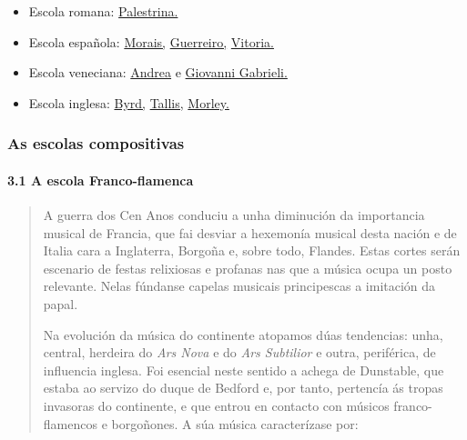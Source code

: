 \documentclass[
]{article}
\begin{document}
\begin{itemize}
\item
  Escola romana:
  \href{http://es.wikipedia.org/wiki/Giovanni_Pierluigi_da_Palestrina}{Palestrina.}
\item
  Escola española:
  \href{http://es.wikipedia.org/wiki/Crist\%C3\%B3bal_de_Morales}{Morais,}
  \href{http://es.wikipedia.org/wiki/Francisco_Guerrero}{Guerreiro,}
  \href{http://es.wikipedia.org/wiki/Tom\%C3\%A1s_Luis_de_Victoria}{Vitoria.}
\item
  Escola veneciana:
  \href{http://es.wikipedia.org/wiki/Andrea_Gabrieli}{Andrea} e
  \href{http://es.wikipedia.org/wiki/Giovanni_Gabrieli}{Giovanni
  Gabrieli.}
\item
  Escola inglesa:
  \href{http://es.wikipedia.org/wiki/William_Byrd}{Byrd,}
  \href{http://es.wikipedia.org/wiki/Thomas_Tallis}{Tallis,}
  \href{http://es.wikipedia.org/wiki/Thomas_Morley}{Morley.}
\end{itemize}

\hypertarget{as-escolas-compositivas}{%
\subsubsection{As escolas compositivas}\label{as-escolas-compositivas}}

\hypertarget{31-a-escola-franco-flamenca}{%
\paragraph{\texorpdfstring{\textbf{3.1 A escola
Franco-flamenca}}{3.1 A escola Franco-flamenca}}\label{31-a-escola-franco-flamenca}}

\begin{quote}
A guerra dos Cen Anos conduciu a unha diminución da importancia musical
de Francia, que fai desviar a hexemonía musical desta nación e de Italia
cara a Inglaterra, Borgoña e, sobre todo, Flandes. Estas cortes serán
escenario de festas relixiosas e profanas nas que a música ocupa un
posto relevante. Nelas fúndanse capelas musicais principescas a
imitación da papal.

Na evolución da música do continente atopamos dúas tendencias: unha,
central, herdeira do \emph{Ars Nova} e do \emph{Ars Subtilior} e outra,
periférica, de influencia inglesa. Foi esencial neste sentido a achega
de Dunstable, que estaba ao servizo do duque de Bedford e, por tanto,
pertencía ás tropas invasoras do continente, e que entrou en contacto
con músicos franco-flamencos e borgoñones. A súa música caracterízase
por:
\end{quote}
\end{document}

